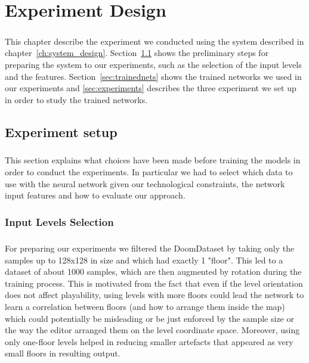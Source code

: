 \chapter{Experiment Design}
\label{ch:experiment}
\paragraph{} This chapter describe the experiment we conducted using the system described in chapter~\ref{ch:system_design}. Section~\ref{sec:experimentdesign} shows the preliminary steps for preparing the system to our experiments, such as the selection of the input levels and the features. Section~\ref{sec:trainednets} shows the trained networks we used in our experiments and \ref{sec:experiments} describes the three experiment we set up in order to study the trained networks.

\section{Experiment setup}
\label{sec:experimentdesign}
\paragraph{} This section explains what choices have been made before training the models in order to conduct the experiments. In particular we had to select which data to use with the neural network given our technological constraints, the network input features and how to evaluate our approach.

\subsection{Input Levels Selection}
\label{sec:InputSelection}
\paragraph{} For preparing our experiments we filtered the DoomDataset by taking only the samples up to 128x128 in size and which had exactly 1 "floor". This led to a dataset of about 1000 samples, which are then augmented by rotation during the training process. This is motivated from the fact that even if the level orientation does not affect playability, using levels with more floors could lead the network to learn a correlation between floors (and how to arrange them inside the map) which could potentially be misleading or be just enforced by the sample size or the way the editor arranged them on the level coordinate space. Moreover, using only one-floor levels helped in reducing smaller artefacts that appeared as very small floors in resulting output.

